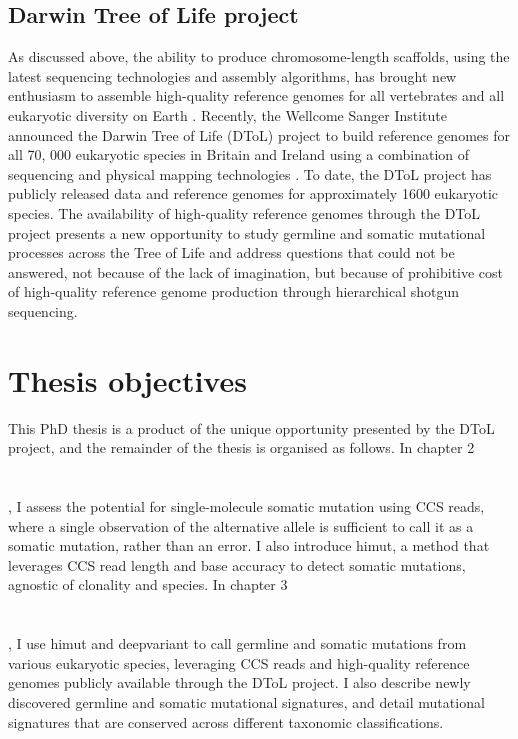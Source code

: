 \subsection{Darwin Tree of Life project}

As discussed above, the ability to produce chromosome-length scaffolds, using the latest sequencing technologies and assembly algorithms, has brought new enthusiasm to assemble high-quality reference genomes for all vertebrates \cite{Rhie2021-dq} and all eukaryotic diversity on Earth \cite{Lewin2018-zf}. Recently, the Wellcome Sanger Institute announced the Darwin Tree of Life (DToL) project to build reference genomes for all 70, 000 eukaryotic species in Britain and Ireland using a combination of sequencing and physical mapping technologies \cite{Darwin_Tree_of_Life_Project_Consortium2022-ma}. To date, the DToL project has publicly released data and reference genomes for approximately 1600 eukaryotic species. The availability of high-quality reference genomes through the DToL project presents a new opportunity to study germline and somatic mutational processes across the Tree of Life and address questions that could not be answered, not because of the lack of imagination, but because of prohibitive cost of high-quality reference genome production through hierarchical shotgun sequencing. 

\section{Thesis objectives}

This PhD thesis is a product of the unique opportunity presented by the DToL project, and the remainder of the thesis is organised as follows. In chapter 2 \section{}, I assess the potential for single-molecule somatic mutation using CCS reads, where a single observation of the alternative allele is sufficient to call it as a somatic mutation, rather than an error. I also introduce himut, a method that leverages CCS read length and base accuracy to detect somatic mutations, agnostic of clonality and species. In chapter 3 \section{},  I use himut and deepvariant to call germline and somatic mutations from various eukaryotic species, leveraging CCS reads and high-quality reference genomes publicly available through the DToL project. I also describe newly discovered germline and somatic mutational signatures, and detail mutational signatures that are conserved across different taxonomic classifications.

